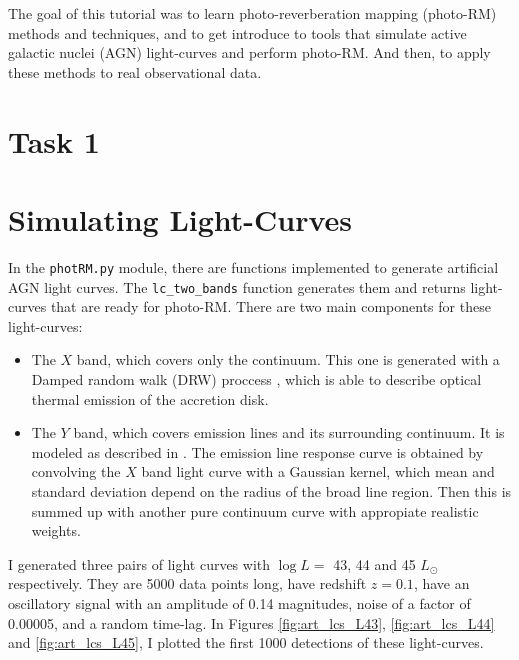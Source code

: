 \documentclass[letterpaper, oneside]{article}
\begin{document}
	
\templatePagecfg

The goal of this tutorial was to learn photo-reverberation mapping (photo-RM) methods and techniques, and to get introduce to tools that simulate active galactic nuclei (AGN) light-curves and perform photo-RM. And then, to apply these methods to real observational data.


\section*{Task 1}

\section{Simulating Light-Curves}

In the \texttt{photRM.py} module, there are functions implemented to generate artificial AGN light curves. The \texttt{lc\_two\_bands} function generates them and returns light-curves that are ready for photo-RM. There are two main components for these light-curves:
\begin{itemize}
	\item The $X$ band, which covers only the continuum. This one is generated with a Damped random walk (DRW) proccess \cite{Kovacevic_2021} \cite{Kelly_2009}, which is able to describe optical thermal emission of the accretion disk.
	
	\item The $Y$ band, which covers emission lines and its surrounding continuum. It is modeled as described in \cite{Jankov_2022} \cite{Chelouche_Daniel_2012}. The emission line response curve is obtained by convolving the $X$ band light curve with a Gaussian kernel, which mean and standard deviation depend on the radius of the broad line region. Then this is summed up with another pure continuum curve with appropiate realistic weights.
\end{itemize}

I generated three pairs of light curves with $\log L = $ 43, 44 and 45 $L_{\odot}$ respectively. They are 5000 data points long, have redshift $z = 0.1$, have an oscillatory signal with an amplitude of 0.14 magnitudes, noise of a factor of 0.00005, and a random time-lag. In Figures \ref{fig:art_lcs_L43}, \ref{fig:art_lcs_L44} and \ref{fig:art_lcs_L45}, I plotted the first 1000 detections of these light-curves.
\end{document}
